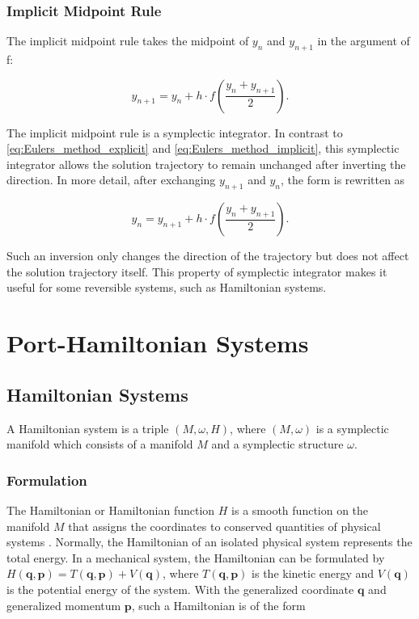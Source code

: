 \documentclass[
	parskip, 			   %
	twoside, 			   %
	DIV=14, 			   %
	BCOR=15.0mm, 		   %
	headsepline, 		   %
	open=right, 		   %
	captions=tableheading, %
	bibliography=totoc,    %
	numbers=noenddot       %
]{scrreprt}
\begin{document}
\subsection{Implicit Midpoint Rule}
The implicit midpoint rule takes the midpoint of $y_{n}$ and $y_{n+1}$ in the argument of f:

\begin{equation}
    \label{eq:Midpoint_rule_implicit}
    y_{n+1} = y_{n} + h \cdot f(\frac{y_{n} + y_{n+1}}{2}).
\end{equation}

The implicit midpoint rule is a symplectic integrator. In contrast to \ref{eq:Eulers_method_explicit} and \ref{eq:Eulers_method_implicit}, this symplectic integrator allows the solution trajectory to remain unchanged after inverting the direction. In more detail, after exchanging $y_{n+1}$ and $y_{n}$, the form is rewritten as

\begin{equation}
    \label{eq:Midpoint_rule_implicit_inverted}
    y_{n} = y_{n+1} + h \cdot f(\frac{y_{n} + y_{n+1}}{2}).
\end{equation}

Such an inversion only changes the direction of the trajectory but does not affect the solution trajectory itself. This property of symplectic integrator makes it useful for some reversible systems, such as Hamiltonian systems.

\clearpage
\chapter{Port-Hamiltonian Systems}
\label{ch:chapter3}

\section{Hamiltonian Systems}
A Hamiltonian system is a triple $(M,\omega,H)$, where $(M,\omega)$ is a symplectic manifold which consists of a manifold $M$ and a symplectic structure $\omega$.

\subsection{Formulation}
The Hamiltonian or Hamiltonian function $H$ is a smooth function on the manifold $M$ that assigns the coordinates to conserved quantities of physical systems \cite{rudolph2017differential}. Normally, the Hamiltonian of an isolated physical system represents the total energy. In a mechanical system, the Hamiltonian can be formulated by $H(\mathbf{q},\mathbf{p})=T(\mathbf{q},\mathbf{p})+V(\mathbf{q})$, where $T(\mathbf{q},\mathbf{p})$ is the kinetic energy and $V(\mathbf{q})$ is the potential energy of the system. With the generalized coordinate $\mathbf{q}$ and generalized momentum $\mathbf{p}$, such a Hamiltonian is of the form
\end{document}
